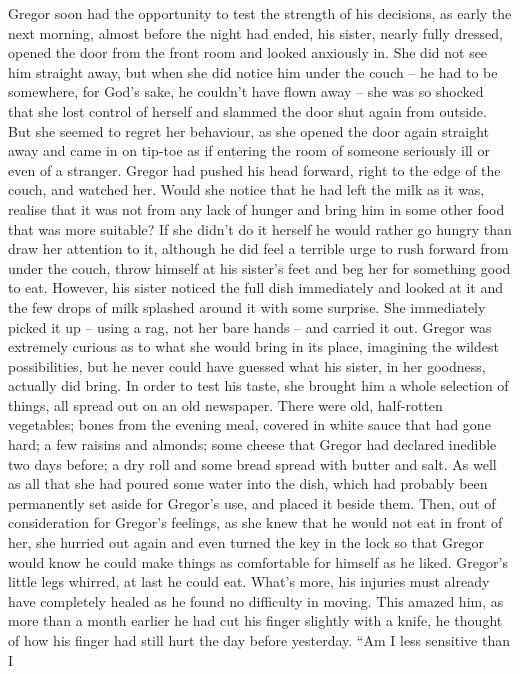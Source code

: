 Gregor soon had the opportunity to test the strength of his decisions,
as early the next morning, almost before the night had ended, his
sister, nearly fully dressed, opened the door from the front room and
looked anxiously in. She did not see him straight away, but when she
did notice him under the couch – he had to be somewhere, for God’s sake,
he couldn’t have flown away – she was so shocked that she lost control of
herself and slammed the door shut again from outside. But she seemed to
regret her behaviour, as she opened the door again straight away and
came in on tip-toe as if entering the room of someone seriously ill or
even of a stranger. Gregor had pushed his head forward, right to the
edge of the couch, and watched her. Would she notice that he had left
the milk as it was, realise that it was not from any lack of hunger and
bring him in some other food that was more suitable? If she didn’t do
it herself he would rather go hungry than draw her attention to it,
although he did feel a terrible urge to rush forward from under the
couch, throw himself at his sister’s feet and beg her for something
good to eat. However, his sister noticed the full dish immediately and
looked at it and the few drops of milk splashed around it with some
surprise. She immediately picked it up – using a rag, not her bare
hands – and carried it out. Gregor was extremely curious as to what she
would bring in its place, imagining the wildest possibilities, but he
never could have guessed what his sister, in her goodness, actually did
bring. In order to test his taste, she brought him a whole selection of
things, all spread out on an old newspaper. There were old, half-rotten
vegetables; bones from the evening meal, covered in white sauce that
had gone hard; a few raisins and almonds; some cheese that Gregor had
declared inedible two days before; a dry roll and some bread spread
with butter and salt. As well as all that she had poured some water
into the dish, which had probably been permanently set aside for
Gregor’s use, and placed it beside them. Then, out of consideration for
Gregor’s feelings, as she knew that he would not eat in front of her,
she hurried out again and even turned the key in the lock so that
Gregor would know he could make things as comfortable for himself as he
liked. Gregor’s little legs whirred, at last he could eat. What’s more,
his injuries must already have completely healed as he found no
difficulty in moving. This amazed him, as more than a month earlier he
had cut his finger slightly with a knife, he thought of how his finger
had still hurt the day before yesterday. “Am I less sensitive than I
